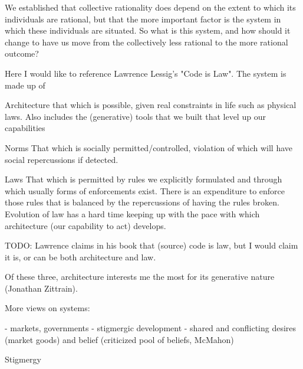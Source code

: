 We established that collective rationality does depend on the extent to which its individuals are rational, but that the more important factor is the system in which these individuals are situated. So what is this system, and how should it change to have us move from the collectively less rational to the more rational outcome?

Here I would like to reference Lawrence Lessig's "Code is Law". The system is made up of 

Architecture
that which is possible, given real constraints in life such as physical laws. Also includes the (generative) tools that we built that level up our capabilities

Norms
That which is socially permitted/controlled, violation of which will have social repercussions if detected.

Laws
That which is permitted by rules we explicitly formulated and through which usually forms of enforcements exist. There is an expenditure to enforce those rules that is balanced by the repercussions of having the rules broken. Evolution of law has a hard time keeping up with the pace with which architecture (our capability to act) develops.

TODO: Lawrence claims in his book that (source) code is law, but I would claim it is, or can be both architecture and law.

Of these three, architecture interests me the most for its generative nature (Jonathan Zittrain).

More views on systems:

- markets, governments
- stigmergic development
- shared and conflicting desires (market goods) and belief (criticized pool of beliefs, McMahon)

Stigmergy